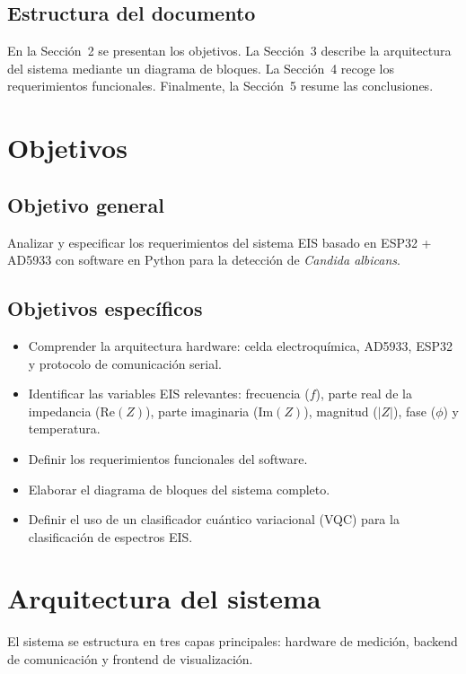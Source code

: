 \documentclass[11pt,a4paper,spanish]{book}
\begin{document}
\section{Estructura del documento}
En la Secci\'{o}n~2 se presentan los objetivos. La Secci\'{o}n~3 describe la arquitectura del sistema mediante un diagrama de bloques. La Secci\'{o}n~4 recoge los requerimientos funcionales. Finalmente, la Secci\'{o}n~5 resume las conclusiones.


\chapter{Objetivos}

\section{Objetivo general}
Analizar y especificar los requerimientos del sistema EIS basado en ESP32 + AD5933 con software en Python para la detecci\'{o}n de \textit{Candida albicans}.

\section{Objetivos espec\'{i}ficos}
\begin{itemize}
	\item Comprender la arquitectura hardware: celda electroqu\'{i}mica, AD5933, ESP32 y protocolo de comunicaci\'{o}n serial.
	\item Identificar las variables EIS relevantes: frecuencia ($f$), parte real de la impedancia ($\mathrm{Re}(Z)$), parte imaginaria ($\mathrm{Im}(Z)$), magnitud ($|Z|$), fase ($\phi$) y temperatura.
	\item Definir los requerimientos funcionales del software.
	\item Elaborar el diagrama de bloques del sistema completo.
	\item Definir el uso de un clasificador cu\'{a}ntico variacional (VQC) para la clasificaci\'{o}n de espectros EIS.
\end{itemize}


\chapter{Arquitectura del sistema}

El sistema se estructura en tres capas principales: hardware de medici\'{o}n, backend de comunicaci\'{o}n y frontend de visualizaci\'{o}n.
\end{document}
